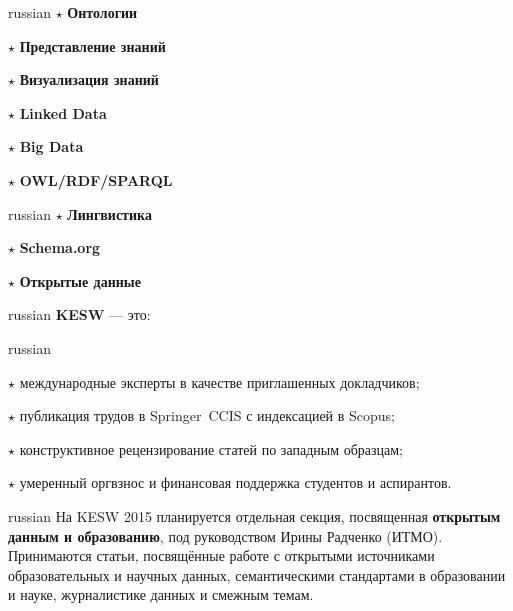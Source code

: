 \documentclass[a4paper, 10pt]{article}
\renewcommand{\skip}{\vspace{1ex}}
\renewcommand{\bullet}{\ensuremath{\star} }
\begin{document}
\begin{minipage}[t]{.35\textwidth}
\begin{otherlanguage*}{russian}
\noindent
\bullet \textbf{Онтологии}

\bullet \textbf{Представление знаний}

\bullet \textbf{Визуализация знаний}

\end{otherlanguage*}
\end{minipage}
\hfill
\begin{minipage}[t]{.30\textwidth}

\bullet \textbf{Linked Data}

\bullet \textbf{Big Data}

\bullet\textbf{OWL/RDF/SPARQL}

\end{minipage}
\hfill
\begin{minipage}[t]{.28\textwidth}

\begin{otherlanguage*}{russian}
\bullet \textbf{Лингвистика}

\bullet \textbf{Schema.org}

\bullet \textbf{Открытые данные}

\end{otherlanguage*}

\end{minipage}

\skip
\skip

\begin{otherlanguage*}{russian}
\noindent \textbf{KESW} --- это:
\end{otherlanguage*}

\skip\skip

\begin{otherlanguage*}{russian}

\noindent\bullet международные эксперты в качестве приглашенных докладчиков;

\noindent\bullet публикация трудов в Springer~CCIS с индексацией в Scopus;

\noindent\bullet конструктивное рецензирование статей по западным образцам;

\noindent\bullet умеренный оргвзнос и финансовая поддержка студентов и аспирантов.

\end{otherlanguage*}

\skip\skip

\begin{otherlanguage*}{russian}
\noindent 
На KESW 2015 планируется отдельная секция, посвященная \textbf{открытым данным и образованию},
под руководством  Ирины Радченко (ИТМО). Принимаются статьи, посвящённые работе с открытыми источниками образовательных и научных данных, семантическими стандартами в образовании и науке, журналистике данных и смежным темам.
\end{otherlanguage*}
\end{document}
